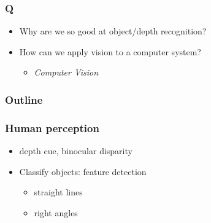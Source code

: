 \documentclass{beamer}
\begin{document}
\frame
{
	\frametitle{Q}
	\begin{itemize}
	\item  <+-| alert@+> Why are we so good at object/depth recognition?
	\item  <+-| alert@+> How can we apply vision to a computer system?
		\begin{itemize}
			\item  <+-| alert@+> {\textit{Computer Vision}}
		\end{itemize}
	\end{itemize}
}


\frame
{
	\frametitle{Outline}
	 
}

\frame
{
	\frametitle{Human perception}
	\begin{itemize}
	\item  <+-| alert@+> depth cue, binocular disparity


	\item  <+-| alert@+> Classify objects: feature detection
		\begin{itemize}
			\item  <+-| alert@+> straight lines
			\item  <+-| alert@+> right angles 
		\end{itemize}
	\end{itemize}
}
\end{document}

